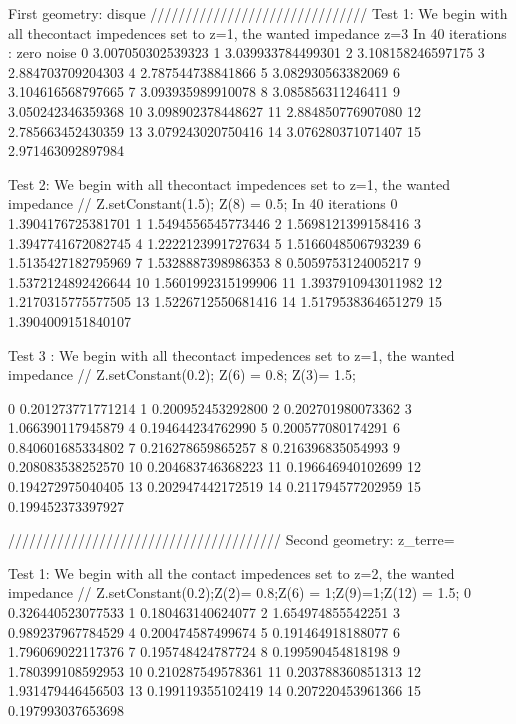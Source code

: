First geometry: disque  
///////////////////////////////
Test 1:
We begin with all thecontact impedences set to z=1, the wanted impedance z=3
In 40 iterations :
       zero noise
  0     3.007050302539323  
  1     3.039933784499301 
  2     3.108158246597175 
  3     2.884703709204303 
  4     2.787544738841866  
  5     3.082930563382069  
  6     3.104616568797665  
  7     3.093935989910078   
  8     3.085856311246411   
  9     3.050242346359368  
  10    3.098902378448627  
  11    2.884850776907080 
  12    2.785663452430359   
  13    3.079243020750416  
  14    3.076280371071407  
  15    2.971463092897984  


  Test 2:
  We begin with all thecontact impedences set to z=1, the wanted impedance  // Z.setConstant(1.5); Z(8) = 0.5;
  In 40 iterations 
  0     1.3904176725381701   
  1     1.5494556545773446   
  2     1.5698121399158416   
  3     1.3947741672082745   
  4     1.2222123991727634   
  5     1.5166048506793239   
  6     1.5135427182795969   
  7     1.5328887398986353   
  8     0.5059753124005217 
  9     1.5372124892426644   
  10    1.5601992315199906  
  11    1.3937910943011982  
  12    1.2170315775577505  
  13    1.5226712550681416  
  14    1.5179538364651279  
  15    1.3904009151840107           

  Test 3 : 
  We begin with all thecontact impedences set to z=1, the wanted impedance  // Z.setConstant(0.2); Z(6) = 0.8; Z(3)= 1.5;

  0     0.201273771771214  
  1     0.200952453292800  
  2     0.202701980073362  
  3     1.066390117945879  
  4     0.194644234762990  
  5     0.200577080174291  
  6     0.840601685334802  
  7     0.216278659865257  
  8     0.216396835054993  
  9     0.208083538252570  
  10    0.204683746368223  
  11    0.196646940102699  
  12    0.194272975040405  
  13    0.202947442172519  
  14    0.211794577202959  
  15    0.199452373397927   


///////////////////////////////////////
 Second geometry: z_terre=

 Test 1:
 We begin with all the contact impedences set to z=2, the wanted impedance  // Z.setConstant(0.2);Z(2)= 0.8;Z(6) = 1;Z(9)=1;Z(12) = 1.5;
0      0.326440523077533
1      0.180463140624077
2      1.654974855542251
3      0.989237967784529
4      0.200474587499674
5      0.191464918188077
6      1.796069022117376
7      0.195748424787724
8      0.199590454818198
9      1.780399108592953
10     0.210287549578361
11     0.203788360851313
12     1.931479446456503
13     0.199119355102419
14     0.207220453961366
15     0.197993037653698

